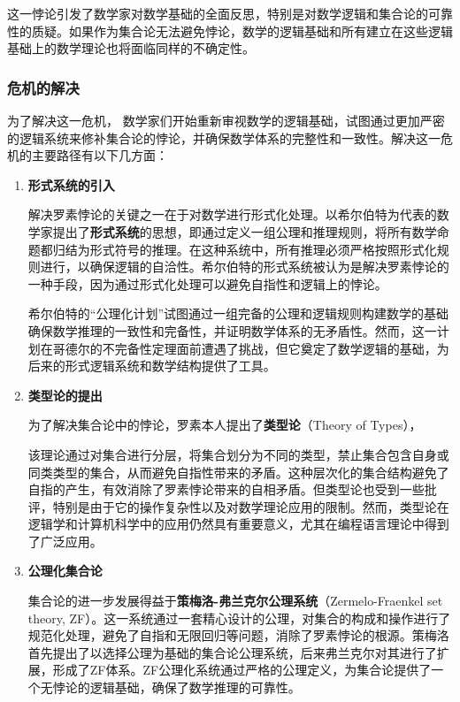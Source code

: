 这一悖论引发了数学家对数学基础的全面反思，特别是对数学逻辑和集合论的可靠性的质疑。如果作为集合论无法避免悖论，数学的逻辑基础和所有建立在这些逻辑基础上的数学理论也将面临同样的不确定性。

\subsubsection{危机的解决}

为了解决这一危机，
数学家们开始重新审视数学的逻辑基础，试图通过更加严密的逻辑系统来修补集合论的悖论，并确保数学体系的完整性和一致性。解决这一危机的主要路径有以下几方面：

\begin{enumerate}
\item {\bf 形式系统的引入}

解决罗素悖论的关键之一在于对数学进行形式化处理。以希尔伯特为代表的数学家提出了{\bf 形式系统}的思想，即通过定义一组公理和推理规则，将所有数学命题都归结为形式符号的推理。在这种系统中，所有推理必须严格按照形式化规则进行，以确保逻辑的自洽性。希尔伯特的形式系统被认为是解决罗素悖论的一种手段，因为通过形式化处理可以避免自指性和逻辑上的悖论。

希尔伯特的“公理化计划”试图通过一组完备的公理和逻辑规则构建数学的基础确保数学推理的一致性和完备性，并证明数学体系的无矛盾性。然而，这一计划在哥德尔的不完备性定理面前遭遇了挑战，但它奠定了数学逻辑的基础，为后来的形式逻辑系统和数学结构提供了工具。

\item {\bf 类型论的提出}

为了解决集合论中的悖论，罗素本人提出了{\bf 类型论}（Theory of Types），

该理论通过对集合进行分层，将集合划分为不同的类型，禁止集合包含自身或同类类型的集合，从而避免自指性带来的矛盾。这种层次化的集合结构避免了自指的产生，有效消除了罗素悖论带来的自相矛盾。但类型论也受到一些批评，特别是由于它的操作复杂性以及对数学理论应用的限制。然而，类型论在逻辑学和计算机科学中的应用仍然具有重要意义，尤其在编程语言理论中得到了广泛应用。

\item {\bf 公理化集合论}

集合论的进一步发展得益于{\bf 策梅洛-弗兰克尔公理系统}（Zermelo-Fraenkel set theory, ZF）。这一系统通过一套精心设计的公理，对集合的构成和操作进行了规范化处理，避免了自指和无限回归等问题，消除了罗素悖论的根源。策梅洛首先提出了以选择公理为基础的集合论公理系统，后来弗兰克尔对其进行了扩展，形成了ZF体系。ZF公理化系统通过严格的公理定义，为集合论提供了一个无悖论的逻辑基础，确保了数学推理的可靠性。


\end{enumerate}
